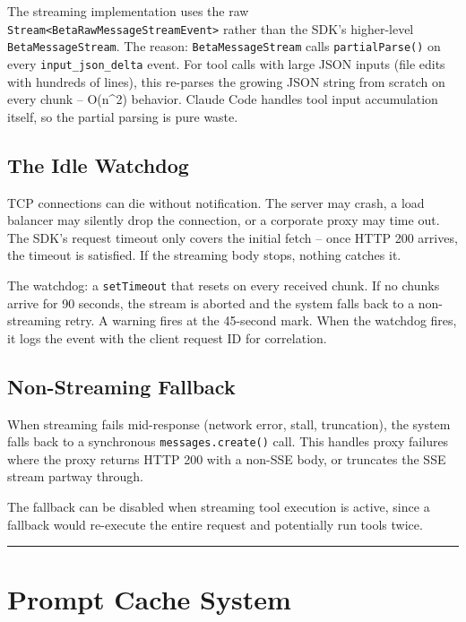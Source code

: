 \documentclass[
  english,
  11pt,
  letterpaper,
]{book}
\begin{document}
The streaming implementation uses the raw
\texttt{Stream\textless{}BetaRawMessageStreamEvent\textgreater{}} rather
than the SDK's higher-level \texttt{BetaMessageStream}. The reason:
\texttt{BetaMessageStream} calls \texttt{partialParse()} on every
\texttt{input\_json\_delta} event. For tool calls with large JSON inputs
(file edits with hundreds of lines), this re-parses the growing JSON
string from scratch on every chunk -- O(n\^{}2) behavior. Claude Code
handles tool input accumulation itself, so the partial parsing is pure
waste.

\subsection{The Idle Watchdog}\label{the-idle-watchdog}

TCP connections can die without notification. The server may crash, a
load balancer may silently drop the connection, or a corporate proxy may
time out. The SDK's request timeout only covers the initial fetch --
once HTTP 200 arrives, the timeout is satisfied. If the streaming body
stops, nothing catches it.

The watchdog: a \texttt{setTimeout} that resets on every received chunk.
If no chunks arrive for 90 seconds, the stream is aborted and the system
falls back to a non-streaming retry. A warning fires at the 45-second
mark. When the watchdog fires, it logs the event with the client request
ID for correlation.

\subsection{Non-Streaming Fallback}\label{non-streaming-fallback}

When streaming fails mid-response (network error, stall, truncation),
the system falls back to a synchronous \texttt{messages.create()} call.
This handles proxy failures where the proxy returns HTTP 200 with a
non-SSE body, or truncates the SSE stream partway through.

The fallback can be disabled when streaming tool execution is active,
since a fallback would re-execute the entire request and potentially run
tools twice.

\begin{center}\rule{0.5\linewidth}{0.5pt}\end{center}

\section{Prompt Cache System}\label{prompt-cache-system}
\end{document}
